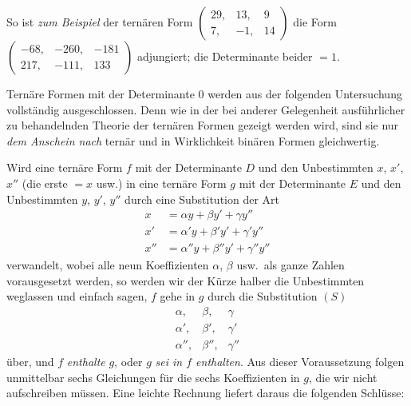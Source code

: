 So ist \textit{zum Beispiel} der ternären Form $\left(\begin{smallmatrix}29,\allowbreak &13,\allowbreak &9\\7,\allowbreak &-1,\allowbreak &14\end{smallmatrix}\right)$ die Form $\left(\begin{smallmatrix}-68,\allowbreak &-260,\allowbreak &-181\\217,\allowbreak &-111,\allowbreak &133\end{smallmatrix}\right)$ adjungiert; die Determinante beider $=1$.

Ternäre Formen mit der Determinante $0$ werden aus der folgenden Untersuchung vollständig ausgeschlossen. Denn wie in der bei anderer Gelegenheit ausführlicher zu behandelnden Theorie der ternären Formen gezeigt werden wird, sind sie nur \textit{dem Anschein nach} ternär und in Wirklichkeit binären Formen gleichwertig.

Wird eine ternäre Form $f$ mit der Determinante $D$ und den Unbestimmten $x$, $x'$, $x''$ (die erste $=x$ usw.) in eine ternäre Form $g$ mit der Determinante $E$ und den Unbestimmten $y$, $y'$, $y''$ durch eine Substitution der Art
\[
\begin{aligned}
x&=\alpha y+\beta y'+\gamma y'' \\
x'&=\alpha'y+\beta'y'+\gamma'y'' \\
x''&=\alpha''y+\beta''y'+\gamma''y''
\end{aligned}
\]
verwandelt, wobei alle neun Koeffizienten $\alpha$, $\beta$ usw.\ als ganze Zahlen vorausgesetzt werden, so werden wir der Kürze halber die Unbestimmten weglassen und einfach sagen, $f$ gehe in $g$ durch die Substitution
$(S)$
\[
\begin{array}{ccc}
\alpha, & \beta, & \gamma \\
\alpha', & \beta', & \gamma' \\
\alpha'', & \beta'', & \gamma''
\end{array}
\]
über, und $f$ \textit{enthalte} $g$, oder $g$ \textit{sei in $f$ enthalten}. Aus dieser Voraussetzung folgen unmittelbar sechs Gleichungen für die sechs Koeffizienten in $g$, die wir nicht aufschreiben müssen. Eine leichte Rechnung liefert daraus die folgenden Schlüsse:

